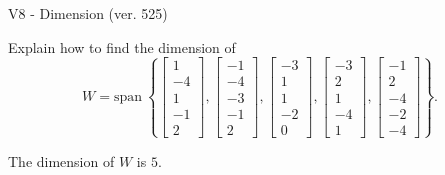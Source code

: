 \begin{exercise}
  \begin{exerciseTitle}V8 - Dimension (ver. 525)\end{exerciseTitle}
  \begin{exerciseStatement}
    Explain how to find the dimension of 
\[W=\mathrm{span}\ \left\{\left[\begin{array}{r}
1 \\
-4 \\
1 \\
-1 \\
2
\end{array}\right] , \left[\begin{array}{r}
-1 \\
-4 \\
-3 \\
-1 \\
2
\end{array}\right] , \left[\begin{array}{r}
-3 \\
1 \\
1 \\
-2 \\
0
\end{array}\right] , \left[\begin{array}{r}
-3 \\
2 \\
1 \\
-4 \\
1
\end{array}\right] , \left[\begin{array}{r}
-1 \\
2 \\
-4 \\
-2 \\
-4
\end{array}\right]\right\}.\]



  \end{exerciseStatement}
  \begin{exerciseAnswer}
   The dimension of \(W\) is  \(5\).
  


  \end{exerciseAnswer}
\end{exercise}